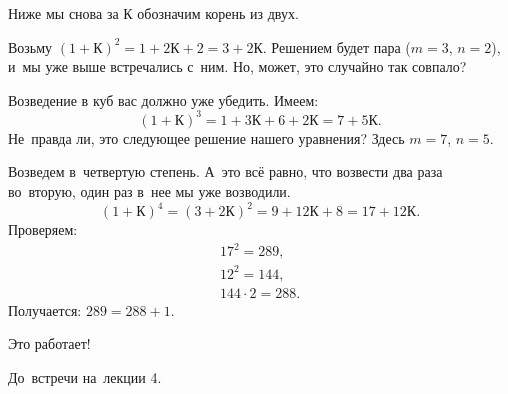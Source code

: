 Ниже мы снова за $\text{К}$ обозначим корень из двух.

Возьму $(1+\text{К})^{2}=1+2\text{К}+2=3+2\text{К}$. Решением будет пара ($m=3$, $n=2$),
и~мы уже выше встречались с~ним. Но, может, это случайно так совпало?

Возведение в куб вас должно уже убедить. Имеем:
$$
(1+\text{К})^{3}=1+3\text{К}+6+2\text{К}=7+5\text{К}.
$$
Не~правда ли, это следующее решение нашего уравнения? Здесь $m=7$, $n=5$.

Возведем в~четвертую степень. А~это всё равно, что возвести два раза во~вторую, один раз в~нее мы уже возводили.
$$
(1+\text{К})^{4}=(3+2\text{К})^{2}=9+12\text{К}+8=17+12\text{К}.
$$
Проверяем:
\begin{gather*}
17^{2} =289,\\
12^{2}=144,\\
144\cdot 2=288.
\end{gather*}
Получается: $289=288+1$.

Это работает!

До~встречи на~лекции 4.

\endinput
